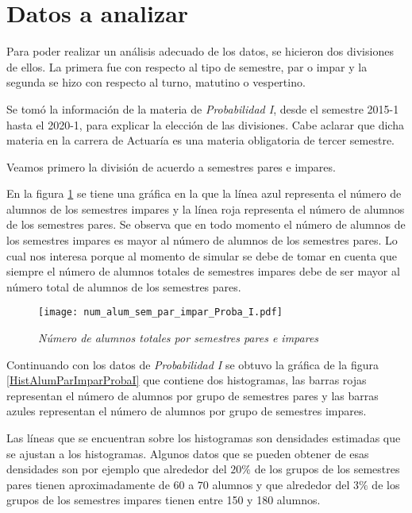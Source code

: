 \section{Datos a analizar}

Para poder realizar un análisis adecuado de los datos, se hicieron dos divisiones de ellos. La primera fue con respecto al tipo de semestre, par o impar y la segunda se hizo con respecto al turno, matutino o vespertino.

Se tomó la información de la materia de \textit{Probabilidad I}, desde el semestre 2015-1 hasta el 2020-1, para explicar la elección de las divisiones. Cabe aclarar que dicha materia en la carrera de Actuaría es una materia obligatoria de tercer semestre.

Veamos primero la división de acuerdo a semestres pares e impares.

En la figura \ref{ParImparProbaI} se tiene una gráfica en la que la línea azul representa el número de alumnos de los semestres impares y la línea roja representa el número de alumnos de los semestres pares. Se observa que en todo momento el número de alumnos de los semestres impares es mayor al número de alumnos de los semestres pares. Lo cual nos interesa porque al momento de simular se debe de tomar en cuenta que siempre el número de alumnos totales de semestres impares debe de ser mayor al número total de alumnos de los semestres pares.

\begin{figure}[h]
\centering
\texttt{[image: num\_alum\_sem\_par\_impar\_Proba\_I.pdf]} %
\caption{\textit{Número de alumnos totales por semestres pares e impares}} \label{ParImparProbaI}
\end{figure}

Continuando con los datos de \textit{Probabilidad I} se obtuvo la gráfica de la figura \ref{HistAlumParImparProbaI} que contiene dos histogramas, las barras rojas representan el número de alumnos por grupo de semestres pares y las barras azules representan el número de alumnos por grupo de semestres impares.

Las líneas que se encuentran sobre los histogramas son densidades estimadas que se ajustan a los histogramas. Algunos datos que se pueden obtener de esas densidades son por ejemplo que alrededor del $20\%$ de los grupos de los semestres pares tienen aproximadamente de $60$ a $70$ alumnos y que alrededor del $3\%$ de los grupos de los semestres impares tienen entre 150 y 180 alumnos.

